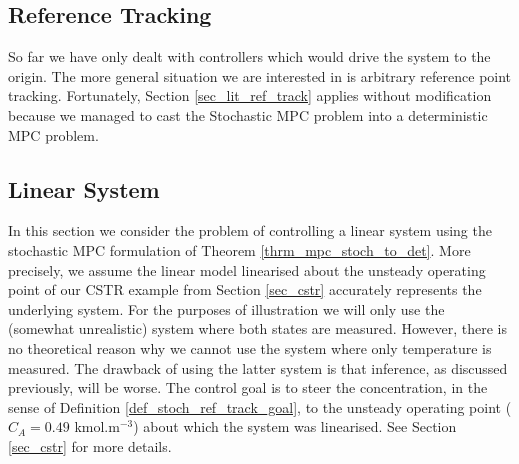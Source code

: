 \subsection{Reference Tracking}
So far we have only dealt with controllers which would drive the system to the origin. The more general situation we are interested in is arbitrary reference point tracking. Fortunately, Section \ref{sec_lit_ref_track} applies without modification because we managed to cast the Stochastic MPC problem into a deterministic MPC problem. 

\subsection{Linear System}
\label{sec_lin_sys_cont}
In this section we consider the problem of controlling a linear system using the stochastic MPC formulation of Theorem \ref{thrm_mpc_stoch_to_det}. More precisely, we assume the linear model linearised about the unsteady operating point of our CSTR example from Section \ref{sec_cstr} accurately represents the underlying system. For the purposes of illustration we will only use the (somewhat unrealistic) system where both states are measured. However, there is no theoretical reason why we cannot use the system where only temperature is measured. The drawback of using the latter system is that inference, as discussed previously, will be worse. The control goal is to steer the concentration, in the sense of Definition \ref{def_stoch_ref_track_goal}, to the unsteady operating point ($C_A = 0.49$ kmol.m$^{-3}$) about which the system was linearised. See Section \ref{sec_cstr} for more details.

